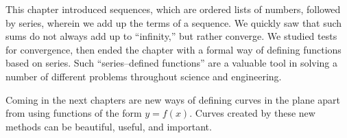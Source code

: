 This chapter introduced sequences, which are ordered lists of numbers, followed by series, wherein we add up the terms of a sequence. We quickly saw that such sums do not always add up to ``infinity,'' but rather converge. We studied tests for convergence, then ended the chapter with a formal way of defining functions based on series. Such ``series--defined functions'' are a valuable tool in solving a number of different problems throughout science and engineering. 

Coming in the next chapters are new ways of defining curves in the plane apart from using functions of the form $y=f(x)$. Curves created by these new methods can be beautiful, useful, and important. 
















































